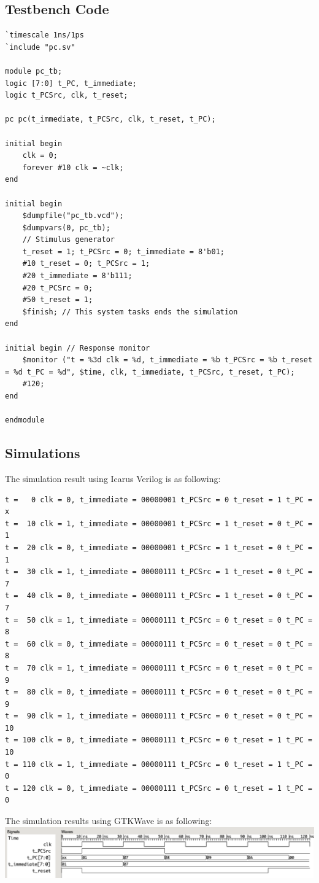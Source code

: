 \documentclass{article}
\begin{document}
\subsection{Testbench Code}
\begin{lstlisting}
`timescale 1ns/1ps
`include "pc.sv"

module pc_tb;
logic [7:0] t_PC, t_immediate;
logic t_PCSrc, clk, t_reset;

pc pc(t_immediate, t_PCSrc, clk, t_reset, t_PC);

initial begin
    clk = 0;
    forever #10 clk = ~clk;
end

initial begin
    $dumpfile("pc_tb.vcd"); 
    $dumpvars(0, pc_tb);
    // Stimulus generator
    t_reset = 1; t_PCSrc = 0; t_immediate = 8'b01;
    #10 t_reset = 0; t_PCSrc = 1;
    #20 t_immediate = 8'b111;
    #20 t_PCSrc = 0;
    #50 t_reset = 1;
    $finish; // This system tasks ends the simulation 
end

initial begin // Response monitor
    $monitor ("t = %3d clk = %d, t_immediate = %b t_PCSrc = %b t_reset = %d t_PC = %d", $time, clk, t_immediate, t_PCSrc, t_reset, t_PC);
    #120;
end

endmodule
\end{lstlisting}

\subsection{Simulations}
The simulation result using Icarus Verilog is as following:
\begin{Verbatim}
t =   0 clk = 0, t_immediate = 00000001 t_PCSrc = 0 t_reset = 1 t_PC =   x
t =  10 clk = 1, t_immediate = 00000001 t_PCSrc = 1 t_reset = 0 t_PC =   1
t =  20 clk = 0, t_immediate = 00000001 t_PCSrc = 1 t_reset = 0 t_PC =   1
t =  30 clk = 1, t_immediate = 00000111 t_PCSrc = 1 t_reset = 0 t_PC =   7
t =  40 clk = 0, t_immediate = 00000111 t_PCSrc = 1 t_reset = 0 t_PC =   7
t =  50 clk = 1, t_immediate = 00000111 t_PCSrc = 0 t_reset = 0 t_PC =   8
t =  60 clk = 0, t_immediate = 00000111 t_PCSrc = 0 t_reset = 0 t_PC =   8
t =  70 clk = 1, t_immediate = 00000111 t_PCSrc = 0 t_reset = 0 t_PC =   9
t =  80 clk = 0, t_immediate = 00000111 t_PCSrc = 0 t_reset = 0 t_PC =   9
t =  90 clk = 1, t_immediate = 00000111 t_PCSrc = 0 t_reset = 0 t_PC =  10
t = 100 clk = 0, t_immediate = 00000111 t_PCSrc = 0 t_reset = 1 t_PC =  10
t = 110 clk = 1, t_immediate = 00000111 t_PCSrc = 0 t_reset = 1 t_PC =   0
t = 120 clk = 0, t_immediate = 00000111 t_PCSrc = 0 t_reset = 1 t_PC =   0
\end{Verbatim}
The simulation results using GTKWave is as following:\vspace{5pt}\\
\includegraphics[width=\textwidth]{pc.png}
\end{document}
